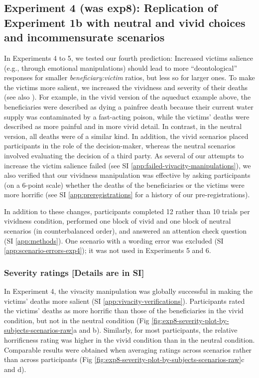 \documentclass[
]{article}
\begin{document}
\clearpage

\subsection{Experiment 4 (was exp8): Replication of Experiment 1b with neutral and vivid choices and incommensurate scenarios}\label{experiment-4-was-exp8-replication-of-experiment-1b-with-neutral-and-vivid-choices-and-incommensurate-scenarios}

In Experiments 4 to 5, we tested our fourth prediction: Increased victims salience (e.g., through emotional manipulations) should lead to more ``deontological'' responses for smaller \emph{beneficiary:victim} ratios, but less so for larger ones. To make the victims more salient, we increased the vividness and severity of their deaths (see also \autocite{Bartels2008}). For example, in the vivid version of the aqueduct example above, the beneficiaries were described as dying a painfree death because their current water supply was contaminated by a fast-acting poison, while the victims' deaths were described as more painful and in more vivid detail. In contrast, in the neutral version, all deaths were of a similar kind. In addition, the vivid scenarios placed participants in the role of the decision-maker, whereas the neutral scenarios involved evaluating the decision of a third party. As several of our attempts to increase the victim salience failed (see SI \ref{app:failed-vivacity-manipulations}), we also verified that our vividness manipulation was effective by asking participants (on a 6-point scale) whether the deaths of the beneficiaries or the victims were more horrific (see SI \ref{app:preregistrations} for a history of our pre-registrations).

In addition to these changes, participants completed 12 rather than 10 trials per vividness condition, performed one block of vivid and one block of neutral scenarios (in counterbalanced order), and answered an attention check question (SI \ref{app:methods}). One scenario with a wording error was excluded (SI \ref{app:scenario-errors-exp4}); it was not used in Experiments 5 and 6.

\subsubsection{Severity ratings {[}Details are in SI{]}}\label{severity-ratings-details-are-in-si}

In Experiment 4, the vivacity manipulation was globally successful in making the victims' deaths more salient (SI \ref{app:vivacity-verifications}). Participants rated the victims' deaths as more horrific than those of the beneficiaries in the vivid condition, but not in the neutral condition (Fig \ref{fig:exp8-severity-plot-by-subjects-scenarios-raw}a and b). Similarly, for most participants, the relative horrificness rating was higher in the vivid condition than in the neutral condition. Comparable results were obtained when averaging ratings across scenarios rather than across participants (Fig \ref{fig:exp8-severity-plot-by-subjects-scenarios-raw}c and d).
\end{document}
